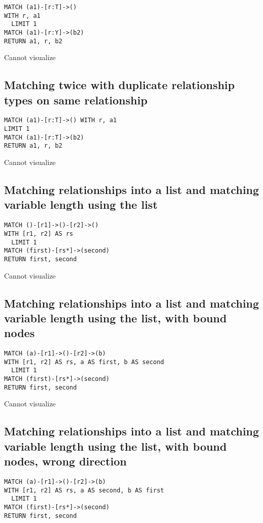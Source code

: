 \begin{lstlisting}
MATCH (a1)-[r:T]->()
WITH r, a1
  LIMIT 1
MATCH (a1)-[r:Y]->(b2)
RETURN a1, r, b2
\end{lstlisting}

Cannot visualize
\subsection{Matching twice with duplicate relationship types on same relationship}

\begin{lstlisting}
MATCH (a1)-[r:T]->() WITH r, a1
LIMIT 1
MATCH (a1)-[r:T]->(b2)
RETURN a1, r, b2
\end{lstlisting}

Cannot visualize
\subsection{Matching relationships into a list and matching variable length using the list}

\begin{lstlisting}
MATCH ()-[r1]->()-[r2]->()
WITH [r1, r2] AS rs
  LIMIT 1
MATCH (first)-[rs*]->(second)
RETURN first, second
\end{lstlisting}

Cannot visualize
\subsection{Matching relationships into a list and matching variable length using the list, with bound nodes}

\begin{lstlisting}
MATCH (a)-[r1]->()-[r2]->(b)
WITH [r1, r2] AS rs, a AS first, b AS second
  LIMIT 1
MATCH (first)-[rs*]->(second)
RETURN first, second
\end{lstlisting}

Cannot visualize
\subsection{Matching relationships into a list and matching variable length using the list, with bound nodes, wrong direction}

\begin{lstlisting}
MATCH (a)-[r1]->()-[r2]->(b)
WITH [r1, r2] AS rs, a AS second, b AS first
  LIMIT 1
MATCH (first)-[rs*]->(second)
RETURN first, second
\end{lstlisting}

